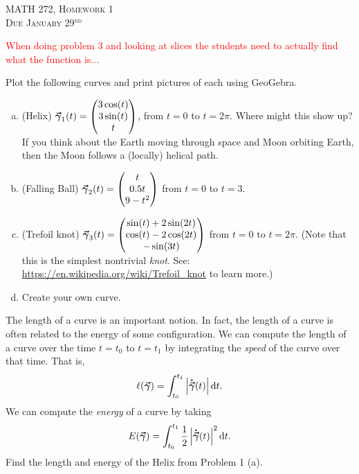 \documentclass[12pt]{article} %
\begin{document}
\begin{center}
   \textsc{\large MATH 272, Homework 1}\\
   \textsc{Due January 29$^\textrm{nd}$}
\end{center}
\vspace{.5cm}
\textcolor{red}{When doing problem 3 and looking at slices the students need to actually find what the function is...}
\begin{problem}
Plot the following curves and print pictures of each using GeoGebra.  
\begin{enumerate}[(a)]
	\item (Helix) $\boldsymbol{\vec{\gamma}}_1(t) = \begin{pmatrix} 3\cos(t) \\ 3\sin(t) \\ t\end{pmatrix}$, from $t=0$ to $t=2\pi$. Where might this show up? If you think about the Earth moving through space and Moon orbiting Earth, then the Moon follows a (locally) helical path.
	
	\item (Falling Ball) $\boldsymbol{\vec{\gamma}}_2(t) = \begin{pmatrix} t\\  0.5t \\ 9-t^2 \end{pmatrix}$ from $t=0$ to $t=3$.
	
	\item (Trefoil knot) $\boldsymbol{\vec{\gamma}}_3(t) = \begin{pmatrix} \sin(t)+2\sin(2t) \\ \cos(t)-2\cos(2t) \\ -\sin(3t) \end{pmatrix}$ from $t=0$ to $t=2\pi$. (Note that this is the simplest nontrivial \emph{knot}. See: \url{https://en.wikipedia.org/wiki/Trefoil_knot} to learn more.)
	
	\item Create your own curve.
\end{enumerate}
\end{problem}

\begin{problem}
The length of a curve is an important notion. In fact, the length of a curve is often related to the energy of some configuration. We can compute the length of a curve over the time $t=t_0$ to $t=t_1$ by integrating the \emph{speed} of the curve over that time.  That is,
\[
\ell(\boldsymbol{\vec{\gamma}}) = \int_{t_0}^{t_1} \left|\boldsymbol{\dot{\vec{\gamma}}}(t)\right| \mathop{}\!\mathrm{d} t.
\]
We can compute the \emph{energy} of a curve by taking
\[
E(\boldsymbol{\vec{\gamma}}) = \int_{t_0}^{t_1} \frac{1}{2} \left| \boldsymbol{\dot{\vec{\gamma}}}(t)\right|^2 \mathop{}\!\mathrm{d} t.
\]
Find the length and energy of the Helix from Problem 1 (a).
\end{problem}
\end{document}
